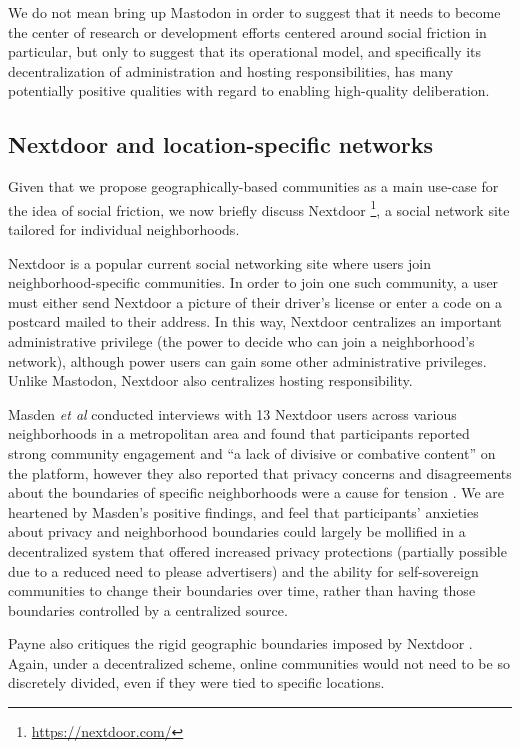 \documentclass[sigconf,authordraft]{acmart}
\begin{document}
We do not mean bring up Mastodon in order to suggest that it needs to become the center of research or development efforts centered around social friction in particular, but only to suggest that its operational model, and specifically its decentralization of administration and hosting responsibilities, has many potentially positive qualities with regard to enabling high-quality deliberation.

\subsection{Nextdoor and location-specific networks}

Given that we propose geographically-based communities as a main use-case for the idea of social friction, we now briefly discuss Nextdoor \footnote{\url{https://nextdoor.com/}}, a social network site tailored for individual neighborhoods.

Nextdoor is a popular current social networking site where users join neighborhood-specific communities. In order to join one such community, a user must either send Nextdoor a picture of their driver's license or enter a code on a postcard mailed to their address. In this way, Nextdoor centralizes an important administrative privilege (the power to decide who can join a neighborhood's network), although power users can gain some other administrative privileges. Unlike Mastodon, Nextdoor also centralizes hosting responsibility.

Masden {\itshape et al} conducted interviews with 13 Nextdoor users across various neighborhoods in a metropolitan area and found that participants reported strong community engagement and ``a lack of divisive or combative content'' on the platform, however they also reported that privacy concerns and disagreements about the boundaries of specific neighborhoods were a cause for tension \cite{masden2014tensions}. We are heartened by Masden's positive findings, and feel that participants' anxieties about privacy and neighborhood boundaries could largely be mollified in a decentralized system that offered increased privacy protections (partially possible due to a reduced need to please advertisers) and the ability for self-sovereign communities to change their boundaries over time, rather than having those boundaries controlled by a centralized source.

Payne also critiques the rigid geographic boundaries imposed by Nextdoor \cite{payne2017welcome}. Again, under a decentralized scheme, online communities would not need to be so discretely divided, even if they were tied to specific locations.
\end{document}
